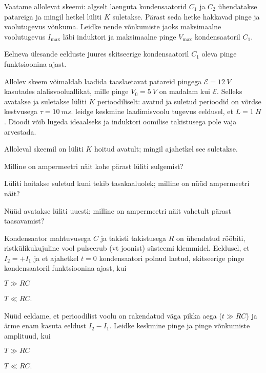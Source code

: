 \documentclass[a4paper,11pt,twocolumn]{article}
\begin{document}
\begin{question}[vv3][5cm]
    Vaatame allolevat skeemi: algselt laenguta kondensaatorid $C_1$ ja $C_2$ ühendatakse patareiga ja mingil hetkel lüliti $K$ suletakse. Pärast seda hetke hakkavad pinge ja voolutugevus võnkuma. Leidke nende võnkumiste jaoks maksimaalne voolutugevus $I_{\mathrm{max}}$ läbi induktori ja maksimaalne pinge $V_{\mathrm{max}}$ kondensaatoril $C_1$.
\end{question}

\begin{question}
    Eelneva ülesande eelduste juures skitseerige kondensaatoril $C_1$ oleva pinge funktsioonina ajast.
\end{question}

\begin{question}[vv4][6cm]
    Allolev skeem võimaldab laadida taaslaetavat patareid pingega $\mathcal{E}=\SI{12}{V}$ kasutades alalisvooluallikat, mille pinge $V_0=\SI{5}{V}$ on madalam kui $\mathcal{E}$. Selleks avatakse ja suletakse lüliti $K$ perioodiliselt: avatud ja suletud perioodid on võrdse kestvusega $\tau=\SI{10}{ms}$. leidge keskmine laadimisvoolu tugevus eeldusel, et $L=\SI{1}{H}$. Dioodi võib lugeda ideaalseks ja induktori oomilise takistusega pole vaja arvestada.
\end{question}

\begin{question}[vv5][6cm]
    Alloleval skeemil on lüliti $K$ hoitud avatult; mingil ajahetkel see suletakse.
    \begin{subquestion}
    \item Milline on ampermeetri näit kohe pärast lüliti sulgemist?
    \item Lüliti hoitakse suletud kuni tekib tasakaaluolek; milline on nüüd ampermeetri näit?
    \item Nüüd avatakse lüliti uuesti; milline on ampermeetri näit vahetult pärast taasavamist?
    \end{subquestion}
\end{question}

\begin{question}[vv6][6cm]
    Kondensaator mahtuvusega $C$ ja takisti takistusega $R$ on ühendatud rööbiti, ristkülikukujuline vool pulseerub (vt joonist) süsteemi klemmidel. Eeldusel, et $I_2=+I_1$ ja et ajahetkel $t=0$ kondensaatori polnud laetud, skitseerige pinge kondensaatoril funktsioonina ajast, kui
    \begin{subquestion}
    \item $T\gg RC$
    \item $T\ll RC$.
    \end{subquestion}
    \vspace{-1em}
    Nüüd eeldame, et perioodilist voolu on rakendatud väga pikka aega ($t\gg RC$) ja ärme enam kasuta eeldust $I_2-I_1$. Leidke keskmine pinge ja pinge võnkumiste amplituud, kui
    \begin{subquestion}
    \item $T\gg RC$
    \item $T\ll RC$.
    \end{subquestion}
\end{question}
\end{document}
